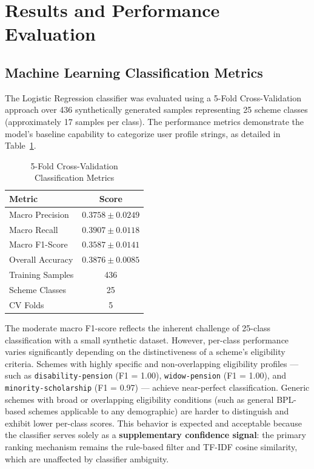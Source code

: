 \documentclass[10pt, journal, twocolumn]{IEEEtran}
\begin{document}
\section{Results and Performance Evaluation}

\subsection{Machine Learning Classification Metrics}
The Logistic Regression classifier was evaluated using a 5-Fold Cross-Validation approach over 436 synthetically generated samples representing 25 scheme classes (approximately 17 samples per class). The performance metrics demonstrate the model's baseline capability to categorize user profile strings, as detailed in Table~\ref{tab:classification_metrics}.

\begin{table}[htbp]
\centering
\caption{5-Fold Cross-Validation Classification Metrics}
\label{tab:classification_metrics}
\begin{tabularx}{\linewidth}{@{}X c@{}}
\toprule
\textbf{Metric} & \textbf{Score} \\
\midrule
Macro Precision & $0.3758 \pm 0.0249$ \\
Macro Recall & $0.3907 \pm 0.0118$ \\
Macro F1-Score & $0.3587 \pm 0.0141$ \\
Overall Accuracy & $0.3876 \pm 0.0085$ \\
Training Samples & 436 \\
Scheme Classes & 25 \\
CV Folds & 5 \\
\bottomrule
\end{tabularx}
\end{table}

The moderate macro F1-score reflects the inherent challenge of 25-class classification with a small synthetic dataset. However, per-class performance varies significantly depending on the distinctiveness of a scheme's eligibility criteria. Schemes with highly specific and non-overlapping eligibility profiles --- such as \texttt{disability-pension} (F1 = 1.00), \texttt{widow-pension} (F1 = 1.00), and \texttt{minority-scholarship} (F1 = 0.97) --- achieve near-perfect classification. Generic schemes with broad or overlapping eligibility conditions (such as general BPL-based schemes applicable to any demographic) are harder to distinguish and exhibit lower per-class scores. This behavior is expected and acceptable because the classifier serves solely as a \textbf{supplementary confidence signal}: the primary ranking mechanism remains the rule-based filter and TF-IDF cosine similarity, which are unaffected by classifier ambiguity.
\end{document}
